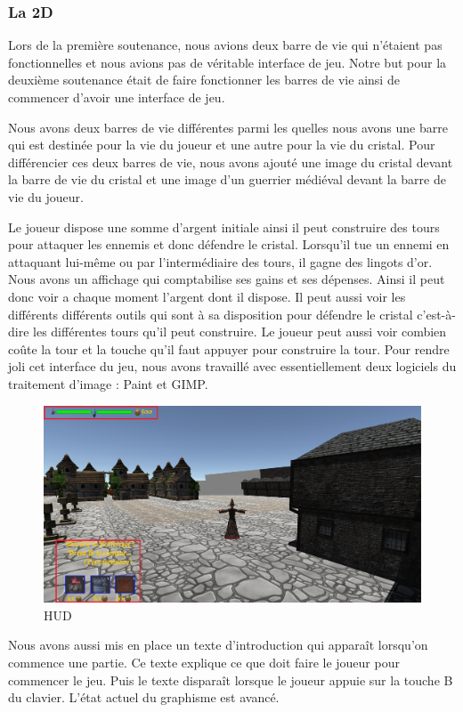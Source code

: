 \documentclass[a4paper, 12pt]{article}
\begin{document}
		\subsubsection{La 2D}
Lors de la première soutenance, nous avions deux barre de vie qui n'étaient pas fonctionnelles et nous avions pas de véritable interface de jeu. Notre but pour la deuxième soutenance était de faire fonctionner les barres de vie ainsi de commencer d’avoir une interface de jeu. 
\par Nous avons deux barres de vie différentes parmi les quelles nous avons une barre qui est destinée pour la vie du joueur et une autre pour la vie du cristal. Pour différencier ces deux barres de vie, nous avons ajouté une image du cristal devant la barre de vie du cristal et une image d’un guerrier médiéval devant la barre de vie du joueur.  
\par Le joueur dispose une somme d’argent initiale ainsi il peut construire des tours pour attaquer les ennemis et donc défendre le cristal. Lorsqu’il tue un ennemi en attaquant lui-même ou par l'intermédiaire des tours, il gagne des lingots d’or. Nous avons un affichage qui comptabilise ses gains et ses dépenses. Ainsi il peut donc voir a chaque moment l’argent dont il dispose. Il peut aussi voir les différents différents outils qui sont à sa disposition pour défendre le cristal  c'est-à-dire les différentes tours qu’il peut construire. Le joueur peut aussi voir combien coûte la tour et la touche qu’il faut appuyer pour construire la tour.   
Pour rendre joli cet interface du jeu, nous avons travaillé avec essentiellement deux logiciels du traitement d’image : Paint et GIMP.
	\begin{figure}[!ht]
		\centerline{\includegraphics[scale=0.3]{GUI.png}}
		\caption*{HUD}
	\end{figure}
\par Nous avons aussi mis en place un texte d’introduction qui apparaît lorsqu’on commence une partie. Ce texte explique ce que doit faire le joueur pour commencer le jeu. Puis le texte disparaît lorsque le joueur appuie sur la touche B du clavier.   
L'état actuel du graphisme est avancé.
\end{document}

